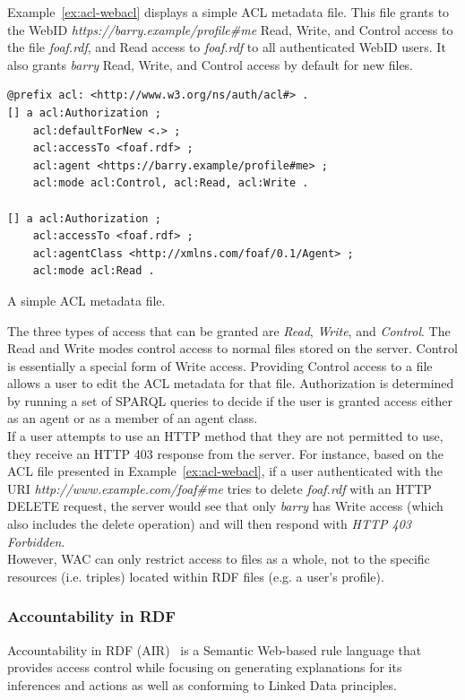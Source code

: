 Example~\ref{ex:acl-webacl} displays a simple ACL metadata file. This file grants to the WebID \textit{https://barry.example/profile\#me} Read, Write, and Control access to the file \textit{foaf.rdf}, and Read access to \textit{foaf.rdf} to all authenticated WebID users. It also grants \textit{barry} Read, Write, and Control access by default for new files.\\

\begin{example}[h]
\begin{verbatim}
@prefix acl: <http://www.w3.org/ns/auth/acl#> .
[] a acl:Authorization ;
    acl:defaultForNew <.> ;
    acl:accessTo <foaf.rdf> ;
    acl:agent <https://barry.example/profile#me> ;
    acl:mode acl:Control, acl:Read, acl:Write .
    
[] a acl:Authorization ;
    acl:accessTo <foaf.rdf> ;
    acl:agentClass <http://xmlns.com/foaf/0.1/Agent> ;
    acl:mode acl:Read .
\end{verbatim}
\caption{A simple ACL metadata file.}
\label{ex:acl-webacl}
\end{example}

The three types of access that can be granted are \textit{Read}, \textit{Write}, and \textit{Control}. The Read and Write modes control access to normal files stored on the server. Control is essentially a special form of Write access. Providing Control access to a file allows a user to edit the ACL metadata for that file. Authorization is determined by running a set of SPARQL queries to decide if the user is granted access either as an agent or as a member of an agent class.\\

If a user attempts to use an HTTP method that they are not permitted to use, they receive an HTTP 403 response from the server. For instance, based on the ACL file presented in Example~\ref{ex:acl-webacl}, if a user authenticated with the URI \textit{http://www.example.com/foaf\#me} tries to delete \textit{foaf.rdf} with an HTTP DELETE request, the server would see that only \textit{barry} has Write access (which also includes the delete operation) and will then respond with \textit{HTTP 403 Forbidden}.\\

However, WAC can only restrict access to files as a whole, not to the specific resources (i.e. triples) located within RDF files (e.g. a user's profile). 

\subsubsection{Accountability in RDF}
Accountability in RDF (AIR)~\cite{kagal2011gasping} is a Semantic Web-based rule language that provides access control while focusing on generating explanations for its inferences and actions as well as conforming to Linked Data principles.\\

